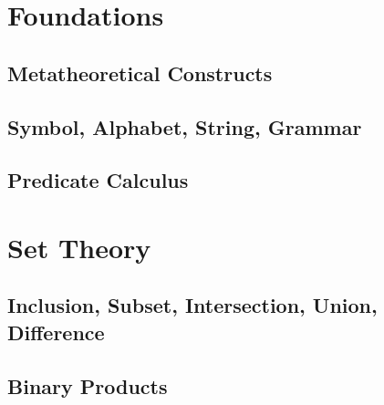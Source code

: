 \section{Foundations}
\subsection{Metatheoretical Constructs}


\subsection{Symbol, Alphabet, String, Grammar}





 
\subsection{Predicate Calculus}






\section{Set Theory}
\subsection{Inclusion, Subset, Intersection, Union, Difference}









\subsection{Binary Products}




